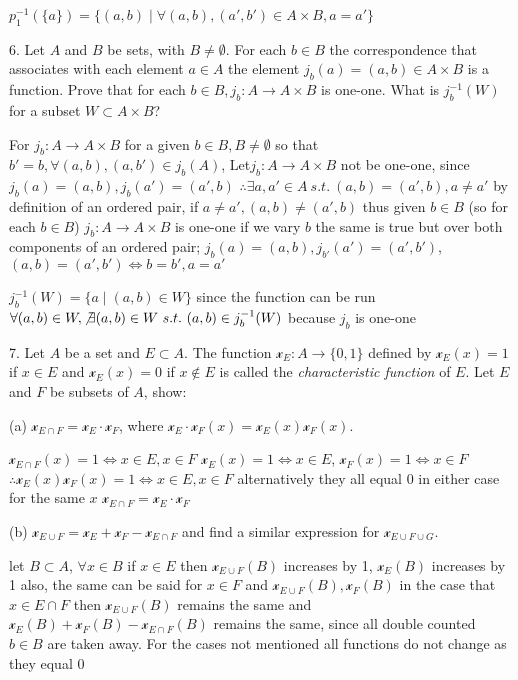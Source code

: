$p_{1}^{-1}(\{ a\}) = \{(a, b) \mid \forall (a, b), (a', b') \in A \times B, a = a' \}$

6. Let $A$ and $B$ be sets, with $B \not = \emptyset$. For each $b \in B$ the correspondence that associates with each element $a \in A$ the element $j_{b}(a) = (a, b) \in A \times B$ is a function. Prove that for each $b \in B, j_{b}:A \rightarrow A \times B$ is one-one. What is $j_{b}^{-1}(W)$ for a subset $W \subset A \times B$?

For $j_{b}:A \rightarrow A \times B$ for a given $b \in B, B \not = \emptyset$ so that $b' = b, \forall(a, b), (a, b') \in j_{b}(A)$,
Let$j_{b}:A \rightarrow A \times B$ not be one-one, since $j_{b}(a) = (a, b), j_{b}(a') = (a', b)$ $\therefore \exists a , a' \in A\ s.t.\ (a, b) = (a', b), a \not = a'$ 
by definition of an ordered pair, if $a \not = a', (a, b) \not = (a', b)$
thus given $b \in B$ (so for each $b \in B$) $j_{b}:A \rightarrow A \times B$ is one-one
if we vary $b$ the same is true but over both components of an ordered pair; $j_{b}(a) = (a, b), j_{b'}(a') = (a', b')$, $(a, b) = (a', b') \iff b = b', a = a'$

$j_{b}^{-1}(W) = \{ a \mid (a, b) \in W\}$ since the function can be run $\forall (a, b) \in W, \not \exists (a, b) \in W\ s.t.\ (a,b) \in j_{b}^{-1}(W)$ because $j_{b}$ is one-one

7. Let $A$ be a set and $E \subset A$. The function $\mathscr{x}_{E}: A \rightarrow \{ 0, 1\}$ defined by $\mathscr{x}_{E}(x) = 1$ if $x \in E$ and $\mathscr{x}_{E}(x) = 0$ if $x \not \in E$ is called the \textit{characteristic function} of $E$. Let $E$ and $F$ be subsets of $A$, show:

(a) $\mathscr{x}_{E \cap F} = \mathscr{x}_{E}\cdot \mathscr{x}_{F}$, where $\mathscr{x}_{E} \cdot \mathscr{x}_{F}(x) = \mathscr{x}_{E}(x) \mathscr{x}_F(x)$. 

$\mathscr{x}_{E\cap F}(x) = 1 \iff  x \in E, x \in F$
$\mathscr{x}_{E}(x) = 1 \iff x \in E$, $\mathscr{x}_{F}(x) = 1 \iff x \in F$
$\therefore \mathscr{x}_{E}(x) \mathscr{x}_F(x) = 1 \iff x \in E, x \in F$
alternatively they all equal $0$ in either case for the same $x$ $\mathscr{x}_{E \cap F} = \mathscr{x}_{E}\cdot \mathscr{x}_{F}$

(b) $\mathscr{x}_{E \cup F} = \mathscr{x}_{E} + \mathscr{x}_{F} - \mathscr{x}_{E \cap F}$ and find a similar expression for $\mathscr{x}_{E \cup F \cup G}$.

let $B \subset A$, 
$\forall x \in B$ if $x \in E$ then $\mathscr{x}_{E \cup F}(B) $ increases by 1, $\mathscr{x}_{E}(B)$ increases by 1 also, the same can be said for $x \in F$ and $\mathscr{x}_{E \cup F}(B) , \mathscr{x}_{F}(B)$
in the case that $x \in E \cap F$ then $\mathscr{x}_{E \cup F}(B)$ remains the same and $\mathscr{x}_{E}(B) + \mathscr{x}_{F}(B) - \mathscr{x}_{E \cap F}(B)$ remains the same, since all double counted $b \in B$ are taken away.
For the cases not mentioned all functions do not change as they equal $0$


